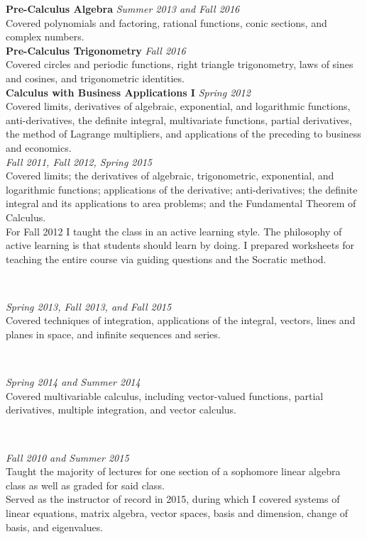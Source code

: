 \documentclass{article}
\begin{document}
\noindent \textbf{Pre-Calculus Algebra} \hfill \textit{Summer 2013 and Fall 2016}\\
Covered polynomials and factoring, rational functions, conic sections, and
complex numbers.
\\

\noindent \textbf{Pre-Calculus Trigonometry} \hfill \textit{Fall 2016} \\
Covered circles and periodic functions, right triangle trigonometry, laws of
sines and cosines, and trigonometric identities.\\

\noindent\textbf{Calculus with Business Applications I} \hfill \textit{Spring 2012}\\
Covered limits, derivatives of algebraic, exponential, and logarithmic
functions, anti-derivatives, the definite integral, multivariate functions,
partial derivatives, the method of Lagrange multipliers, and applications of the
preceding to business and economics.
\\

 \hfill {\it Fall 2011, Fall 2012, Spring 2015}\\
Covered limits; the derivatives of algebraic, trigonometric, exponential, and
logarithmic functions; applications of the derivative; anti-derivatives; the
definite integral and its applications to area problems; and the Fundamental
Theorem of Calculus. \\ For Fall 2012 I taught the class in an active learning
style. The philosophy of active learning is that students should learn by
doing. I prepared worksheets for teaching the entire course via guiding
questions and the Socratic method.

\

 \hfill {\it Spring 2013, Fall 2013, and Fall 2015}\\
Covered techniques of integration, applications of the
integral, vectors, lines and planes in space, and infinite sequences
and series.  

\

 \hfill {\it Spring 2014 and Summer 2014}\\
Covered multivariable calculus, including vector-valued
functions, partial derivatives, multiple integration, and vector
calculus. 

\

 \hfill {\it Fall 2010 and Summer 2015}\\
Taught the majority of lectures for one section of a sophomore linear algebra
class as well as graded for said class.\\ Served as the instructor of record in
2015, during which I covered systems of linear equations, matrix algebra, vector
spaces, basis and dimension, change of basis, and eigenvalues.
\end{document}
